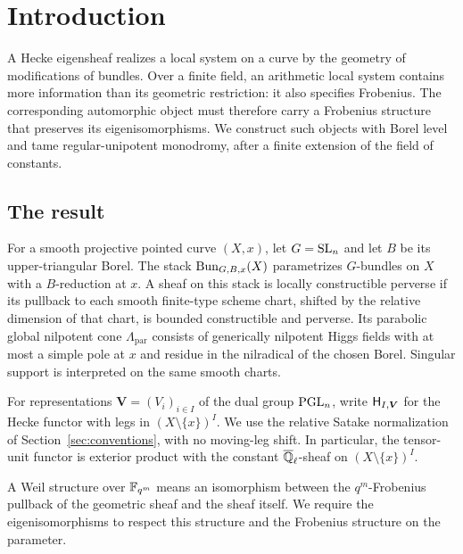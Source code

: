 \section{Introduction}\label{sec:introduction}

A Hecke eigensheaf realizes a local system on a curve by the geometry of
modifications of bundles. Over a finite field, an arithmetic local system
contains more information than its geometric restriction: it also specifies
Frobenius. The corresponding automorphic object must therefore carry a
Frobenius structure that preserves its eigenisomorphisms. We construct such
objects with Borel level and tame regular-unipotent monodromy, after a finite
extension of the field of constants.

\subsection{The result}

For a smooth projective pointed curve $(X,x)$, let $G=\mathrm{SL}_n$ and
let $B$ be its upper-triangular Borel. The stack
$\operatorname{Bun}_{G,B,x}(X)$ parametrizes $G$-bundles on $X$ with a $B$-reduction
at $x$. A sheaf on this stack is locally constructible perverse if its
pullback to each smooth finite-type scheme chart, shifted by the relative
dimension of that chart, is bounded constructible and perverse. Its
parabolic global nilpotent cone $\Lambda_{\mathrm{par}}$ consists of
generically nilpotent Higgs fields with at most a simple pole at $x$ and
residue in the nilradical of the chosen Borel. Singular support is
interpreted on the same smooth charts.

For representations $\boldsymbol V=(V_i)_{i\in I}$ of the dual group
$\mathrm{PGL}_n$, write $\mathsf H_{I,\boldsymbol V}$ for the Hecke functor with
legs in $(X\setminus\{x\})^I$. We use the relative Satake normalization
of Section~\ref{sec:conventions}, with no moving-leg shift. In particular,
the tensor-unit functor is exterior product with the constant
$\overline{\mathbb Q}_{\ell}$-sheaf on $(X\setminus\{x\})^I$.

A Weil structure over $\mathbb F_{q^m}$ means an isomorphism between the
$q^m$-Frobenius pullback of the geometric sheaf and the sheaf itself.
We require the eigenisomorphisms to respect this structure and the
Frobenius structure on the parameter.

